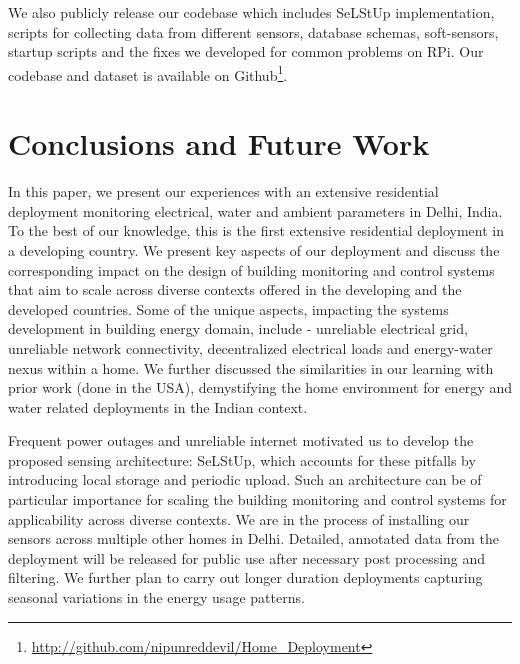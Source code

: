 \documentclass[10pt]{sensys-proc}
\newcommand{\selstup}{SeLStUp}
\newcommand{\selstups}{SeLStUp }
\begin{document}
We also publicly release our codebase which includes \selstups implementation, scripts for collecting data from different sensors, database schemas, soft-sensors, startup scripts and the fixes we developed for common problems on RPi. Our codebase and dataset is available on Github\footnote{\url{http://github.com/nipunreddevil/Home_Deployment}}.

\vspace{-1mm}
\section{Conclusions and Future Work}
 In this paper, we present our experiences with an extensive residential deployment monitoring electrical, water and ambient parameters in Delhi, India. To the best of our knowledge, this is the first extensive residential deployment in a developing country. We present key aspects of our deployment and discuss the corresponding impact on the design of building monitoring and control systems that aim to scale across diverse contexts offered in the developing and the developed countries. Some of the unique aspects, impacting the systems development in building energy domain, include - unreliable electrical grid, unreliable network connectivity, decentralized electrical loads and energy-water nexus within a home. We further discussed the similarities in our learning with prior work (done in the USA), demystifying the home environment for energy and water related deployments in the Indian context. %

Frequent power outages and unreliable internet motivated us to develop the proposed sensing architecture: \selstup, which accounts for these pitfalls by introducing local storage and periodic upload. Such an architecture can be of particular importance for scaling the building monitoring and control systems for applicability across diverse contexts. %
We are in the process of installing our sensors across multiple other homes in Delhi. Detailed, annotated data from the deployment will be released for public use after necessary post processing and filtering. We further plan to carry out longer duration deployments capturing seasonal variations in the energy usage patterns. %

\balance

 
\end{document}

